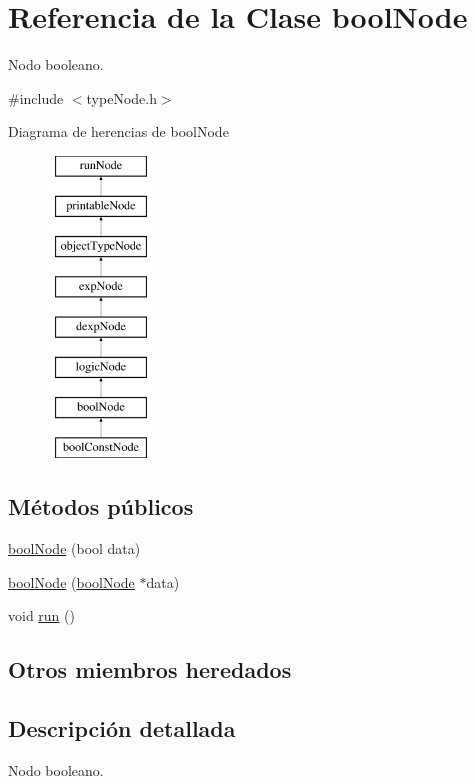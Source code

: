 \hypertarget{classboolNode}{\section{Referencia de la Clase bool\-Node}
\label{classboolNode}
}


Nodo booleano.  




{\ttfamily \#include $<$type\-Node.\-h$>$}

Diagrama de herencias de bool\-Node\begin{figure}[H]
\begin{center}
\leavevmode
\includegraphics[height=8.000000cm]{classboolNode}
\end{center}
\end{figure}
\subsection*{Métodos públicos}
\begin{DoxyCompactItemize}
\item 
\hyperlink{classboolNode_a524ead471357541fbd134467f831e414}{bool\-Node} (bool data)
\item 
\hyperlink{classboolNode_af8d6de46de3631dfd1d9ae131dab374e}{bool\-Node} (\hyperlink{classboolNode}{bool\-Node} $\ast$data)
\item 
void \hyperlink{classboolNode_a98c7446189867e474cd759334b30a9ad}{run} ()
\end{DoxyCompactItemize}
\subsection*{Otros miembros heredados}


\subsection{Descripción detallada}
Nodo booleano. 

